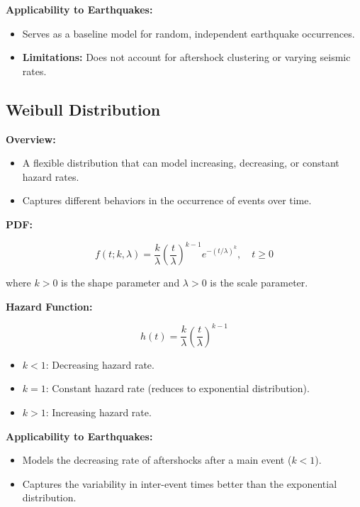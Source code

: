 \documentclass{article}
\begin{document}
\textbf{Applicability to Earthquakes:}

\begin{itemize}
    \item Serves as a baseline model for random, independent earthquake occurrences.
    \item \textbf{Limitations:} Does not account for aftershock clustering or varying seismic rates.
\end{itemize}

\subsection{Weibull Distribution}

\textbf{Overview:}

\begin{itemize}
    \item A flexible distribution that can model increasing, decreasing, or constant hazard rates.
    \item Captures different behaviors in the occurrence of events over time.
\end{itemize}

\textbf{PDF:}

\[
f(t; k, \lambda) = \frac{k}{\lambda} \left( \frac{t}{\lambda} \right)^{k-1} e^{-(t/\lambda)^k}, \quad t \geq 0
\]

where $k > 0$ is the shape parameter and $\lambda > 0$ is the scale parameter.

\textbf{Hazard Function:}

\[
h(t) = \frac{k}{\lambda} \left( \frac{t}{\lambda} \right)^{k-1}
\]

\begin{itemize}
    \item $k < 1$: Decreasing hazard rate.
    \item $k = 1$: Constant hazard rate (reduces to exponential distribution).
    \item $k > 1$: Increasing hazard rate.
\end{itemize}

\textbf{Applicability to Earthquakes:}

\begin{itemize}
    \item Models the decreasing rate of aftershocks after a main event ($k < 1$).
    \item Captures the variability in inter-event times better than the exponential distribution.
\end{itemize}
\end{document}
